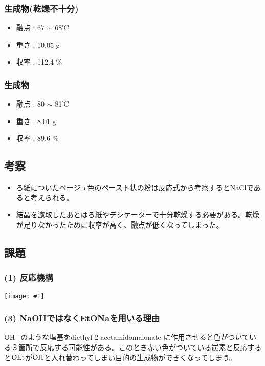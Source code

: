 \documentclass[a4paper,papersize,dvipdfmx]{jsarticle}
\newcommand{\pict}[2]{\begin{center} \texttt{[image: \#1]} \end{center}}   %
\begin{document}
\subsubsection*{生成物(乾燥不十分)}
\begin{itemize}
\item 融点 : 67 $\sim$ 68℃
\item 重さ : 10.05 g
\item 収率 : 112.4 $\%$
\end{itemize}
\subsubsection*{生成物}
\begin{itemize}
\item 融点 : 80 $\sim$ 81℃
\item 重さ : 8.01 g
\item 収率 : 89.6 $\%$

\end{itemize}
\subsection*{考察}
\begin{itemize}
\item ろ紙についたベージュ色のペースト状の粉は反応式から考察するとNaClであると考えられる。
\item 結晶を濾取したあとはろ紙やデシケーターで十分乾燥する必要がある。乾燥が足りなかったために収率が高く、融点が低くなってしまった。

\end{itemize}
\subsection*{課題}

\subsubsection*{(1) 反応機構}
\pict{imgs4/hk.jpeg}{12}

\subsubsection*{(3) NaOHではなくEtONaを用いる理由}

$\rm OH^-$のような塩基をdiethyl 2-acetamidomalonate に作用させると色がついている３箇所で反応する可能性がある。このとき赤い色がついている炭素と反応すると$\rm OEt$が$\rm OH$と入れ替わってしまい目的の生成物ができくなってしまう。
\end{document}
